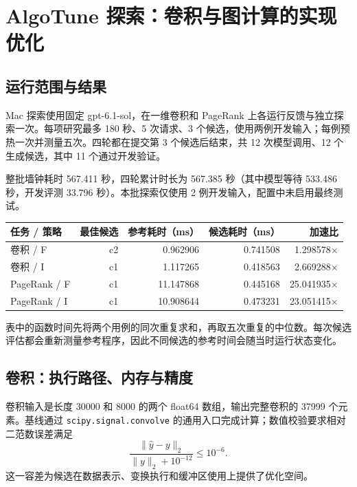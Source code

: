 \section{AlgoTune 探索：卷积与图计算的实现优化}\label{sec:mac}
\subsection{运行范围与结果}
Mac 探索使用固定 gpt-6.1-sol，在一维卷积和 PageRank 上各运行反馈与独立探索一次。每项研究最多 180 秒、5 次请求、3 个候选，使用两例开发输入；每例预热一次并测量五次。四轮都在提交第 3 个候选后结束，共 12 次模型调用、12 个生成候选，其中 11 个通过开发验证。

整批墙钟耗时 567.411 秒，四轮累计时长为 567.385 秒（其中模型等待 533.486 秒，开发评测 33.796 秒）。本批探索仅使用 2 例开发输入，配置中未启用最终测试。

\begin{smalltable}
\begin{tabularx}{\linewidth}{@{}Lrrrr@{}}\toprule
任务 / 策略 & 最佳候选 & 参考耗时（ms） & 候选耗时（ms） & 加速比\\\midrule
卷积 / F & c2 & 0.962906 & 0.741508 & 1.298578$\times$\\
卷积 / I & c1 & 1.117265 & 0.418563 & 2.669288$\times$\\
PageRank / F & c1 & 11.147868 & 0.445168 & 25.041935$\times$\\
PageRank / I & c1 & 10.908644 & 0.473231 & 23.051415$\times$\\\bottomrule
\end{tabularx}
\end{smalltable}

表中的函数时间先将两个用例的同次重复求和，再取五次重复的中位数。每次候选评估都会重新测量参考程序，因此不同候选的参考时间会随当时运行状态变化。


\subsection{卷积：执行路径、内存与精度}
卷积输入是长度 30000 和 8000 的两个 float64 数组，输出完整卷积的 37999 个元素。基线通过 \texttt{scipy.signal.convolve} 的通用入口完成计算；数值校验要求相对二范数误差满足
\[
 \frac{\|\hat y-y\|_2}{\|y\|_2+10^{-12}}\le 10^{-6}.
\]
这一容差为候选在数据表示、变换执行和缓冲区使用上提供了优化空间。

